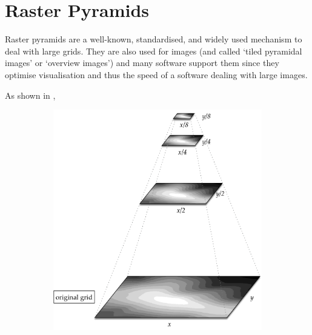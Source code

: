 %
\section{Raster Pyramids}


Raster pyramids are a well-known, standardised, and widely used mechanism to deal with large grids.
They are also used for images (and called `tiled pyramidal images' or `overview images') and many software support them since they optimise visualisation and thus the speed of a software dealing with large images.

As shown in , 
\begin{figure}
  \centering
  \begin{subfigure}[b]{0.6\linewidth}
    \centering
    \includegraphics[width=\textwidth]{figs/pyramids.pdf}
    \caption{}
  \end{subfigure}
  \qquad%
  \begin{subfigure}[b]{0.15\linewidth}
    \centering

\end{subfigure}
\end{figure}
